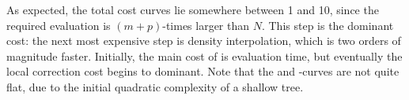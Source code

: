 \begin{figure}[!htb]
  \centering
  \hfill
\end{figure}

As expected, the \qbkix total cost curves lie somewhere between 1 and 10, since the required \fmm evaluation is $(m+p)$-times larger than $N$.
This step is the dominant cost: the next most expensive step is density interpolation, which is two orders of magnitude faster.
Initially, the main cost of \cite{YBZ} is \fmm evaluation time, but eventually the local correction cost begins to dominant.
Note that the \qbkix and \cite{YBZ}-\fmm curves are not quite flat, due to the initial quadratic complexity of a shallow \fmm tree.

